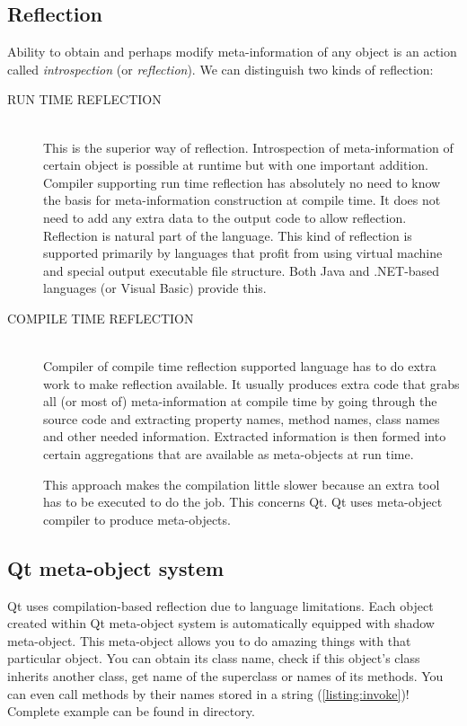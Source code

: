 \subsection{Reflection}
Ability to obtain and perhaps modify meta-information of any object is an action called \textit{introspection} (or \textit{reflection}). We can distinguish two kinds of reflection:
\begin{description}
\item[RUN TIME REFLECTION] \hfill \\
This is the superior way of reflection. Introspection of meta-information of certain object is possible at runtime but with one important addition. Compiler supporting run time reflection has absolutely no need to know the basis for meta-information construction at compile time. It does not need to add any extra data to the output code to allow reflection. Reflection is natural part of the language. This kind of reflection is supported primarily by languages that profit from using virtual machine and special output executable file structure. Both Java and .NET-based languages (\eg \csharp or Visual Basic) provide this.
\item[COMPILE TIME REFLECTION] \hfill \\
Compiler of compile time reflection supported language has to do extra work to make reflection available. It usually produces extra code that grabs all (or most of) meta-information at compile time by going through the source code and extracting property names, method names, class names and other needed information. Extracted information is then formed into certain aggregations that are available as meta-objects at run time.

This approach makes the compilation little slower because an extra tool has to be executed to do the job. This concerns Qt. Qt uses meta-object compiler to produce meta-objects.
\end{description}

\subsection{Qt meta-object system}
Qt uses compilation-based reflection due to \cpp language limitations. Each object created within Qt meta-object system is automatically equipped with shadow meta-object. This meta-object allows you to do amazing things with that particular object. You can obtain its class name, check if this object's class inherits another class, get name of the superclass or names of its methods. You can even call methods by their names stored in a string (\autoref{listing:invoke})! Complete example can be found in directory.

